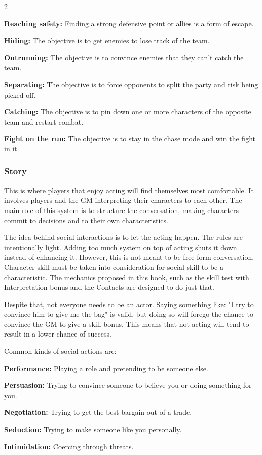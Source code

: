 \begin{multicols}{2}
\begin{proplist}
  \item \textbf{Reaching safety:} Finding a strong defensive point or allies is a form of escape.
  \item \textbf{Hiding:} The objective is to get enemies to lose track of the team.
  \item \textbf{Outrunning:} The objective is to convince enemies that they can't catch the team.
  \item \textbf{Separating:} The objective is to force opponents to split the party and risk being picked off.
  \item \textbf{Catching:} The objective is to pin down one or more characters of the opposite team and restart combat.
  \item \textbf{Fight on the run:} The objective is to stay in the chase mode and win the fight in it.
\end{proplist}

\subsubsection{Story} 

This is where players that enjoy acting will find themselves most comfortable. It involves players and the GM interpreting their characters to each other. The main role of this system is to structure the conversation, making characters commit to decisions and to their own characteristics.

The idea behind social interactions is to let the acting happen. The rules are intentionally light. Adding too much system on top of acting shuts it down instead of enhancing it. However, this is not meant to be free form conversation. Character skill must be taken into consideration for social skill to be a characteristic. The mechanics proposed in this book, such as the skill test with Interpretation bonus and the Contacts are designed to do just that.

Despite that, not everyone needs to be an actor. Saying something like: "I try to convince him to give me the bag" is valid, but doing so will forego the chance to convince the GM to give a skill bonus. This means that not acting will tend to result in a lower chance of success. 

Common kinds of social actions are:

\begin{proplist}
  \item \textbf{Performance:} Playing a role and pretending to be someone else.
  \item \textbf{Persuasion:} Trying to convince someone to believe you or doing something for you.
  \item \textbf{Negotiation:} Trying to get the best bargain out of a trade.
  \item \textbf{Seduction:} Trying to make someone like you personally.
  \item \textbf{Intimidation:} Coercing through threats.
\end{proplist}


\end{multicols}
